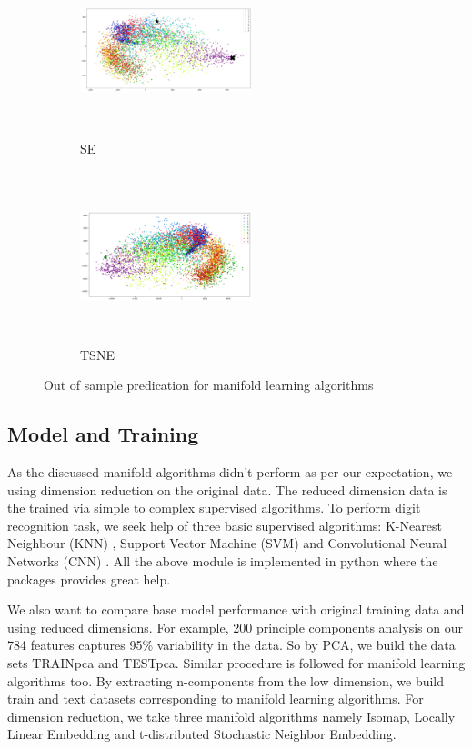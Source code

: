 \begin{figure}[t!]
\medskip
\begin{subfigure}{0.32\textwidth}
\includegraphics[height=5cm,width=5cm]{./Figures/SE_OS.png}
\caption{SE}
\end{subfigure}\hspace*{\fill}
\begin{subfigure}{0.32\textwidth}
\includegraphics[height=5cm,width=5cm]{./Figures/TSNE_OS.png}
\caption{TSNE} 
\end{subfigure}

\caption{Out of sample predication for manifold learning algorithms} \label{OSML}
\end{figure}

\subsection{Model and Training}
As the discussed manifold algorithms didn't perform as per our expectation, we using dimension reduction on the original data. The reduced dimension data is the trained via simple to complex supervised algorithms. To perform digit recognition task, we seek help of three basic supervised algorithms:  K-Nearest Neighbour (KNN) \citep{Babu2014} , Support Vector Machine (SVM) \citep{Stein2008} and Convolutional Neural Networks (CNN) \citep{Ah2010}. All the above module is implemented in python where the packages provides great help. 

We also want to compare base model performance with original training data and using reduced dimensions. For example, 200 principle components analysis on our 784 features captures 95\% variability in the data. So by PCA, we build the data sets TRAINpca and TESTpca. Similar procedure is followed for manifold learning algorithms too. By extracting n-components from the low dimension, we build train and text datasets corresponding to manifold learning algorithms. For dimension reduction, we take three manifold algorithms namely Isomap, Locally Linear Embedding and t-distributed Stochastic Neighbor Embedding.


